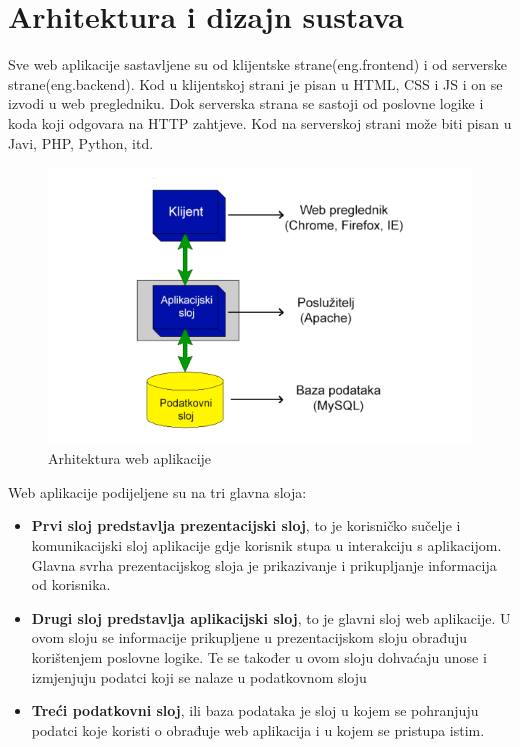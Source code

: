 \chapter{Arhitektura i dizajn sustava}


Sve web aplikacije sastavljene su od klijentske strane(eng.frontend) i od serverske strane(eng.backend). Kod u klijentskoj strani je pisan u HTML, CSS i JS i on se izvodi u web pregledniku. Dok serverska strana se sastoji od poslovne logike i koda koji odgovara na HTTP zahtjeve. Kod na serverskoj strani može biti pisan u Javi, PHP, Python, itd.



\begin{figure}[H]
	
	\includegraphics[width=\textwidth]{slike/webAplikacija.png} %
	\centering
	\caption{Arhitektura web aplikacije}
	\label{fig:arhitekturaWebApp}
\end{figure}
Web aplikacije podijeljene su na tri glavna sloja:

\begin{itemize}
	\item \textbf{Prvi sloj predstavlja prezentacijski sloj}, to je korisničko sučelje i komunikacijski sloj aplikacije gdje korisnik stupa u interakciju s aplikacijom. Glavna svrha prezentacijskog sloja je prikazivanje i prikupljanje informacija od korisnika.
	\item\textbf{Drugi sloj predstavlja aplikacijski sloj}, to je glavni sloj web aplikacije. U ovom sloju se informacije prikupljene u prezentacijskom sloju obrađuju korištenjem poslovne logike. Te se također u ovom sloju dohvaćaju unose i izmjenjuju podatci koji se nalaze u podatkovnom sloju
	\item\textbf{Treći podatkovni sloj}, ili baza podataka je sloj u kojem se pohranjuju podatci koje koristi o obrađuje web aplikacija i u kojem se pristupa istim.
\end{itemize} 

